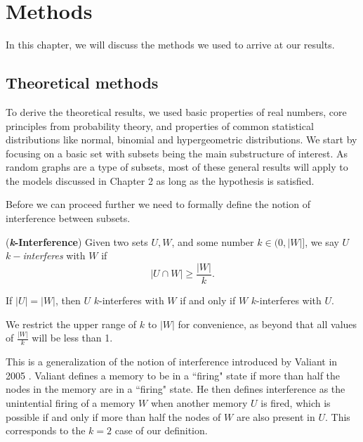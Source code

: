 \chapter{Methods}

In this chapter, we will discuss the methods we used to arrive at our results. 

\section{Theoretical methods}

To derive the theoretical results, we used basic properties of real numbers, core principles from probability theory, and properties of common statistical distributions like normal, binomial and hypergeometric distributions. We start by focusing on a basic set with subsets being the main substructure of interest. As random graphs are a type of subsets, most of these general results will apply to the models discussed in Chapter 2 as long as the hypothesis is satisfied. 

Before we can proceed further we need to formally define the notion of interference between subsets. 

\begin{definition}
    (\textbf{\textit{k}-Interference}) Given two sets $U, W$, and some number $k \in (0,|W|]$, we say $U$ $k-$\textit{interferes} with $W$ if 
    \begin{equation}
        |U \cap W| \ge  \frac{|W|}{k}.
    \end{equation}
\end{definition}

\begin{corollary}
    \label{collorary:k-int-equals}
        If $|U| = |W|$, then $U$ $k$-interferes with $W$ if and only if $W$ $k$-interferes with $U$.
    \end{corollary}
    
We restrict the upper range of $k$ to $|W|$ for convenience, as beyond that all values of $\frac{|W|}{k}$ will be less than 1.

This is a generalization of the notion of interference introduced by Valiant in 2005 \cite{valiant2005memorization}. Valiant defines a memory to be in a ``firing" state if more than half the nodes in the memory are in a ``firing" state. He then defines interference as the unintential firing of a memory $W$ when another memory $U$ is fired, which is possible if and only if more than half the nodes of $W$ are also present in $U$. This corresponds to the $k = 2$ case of our definition. 

